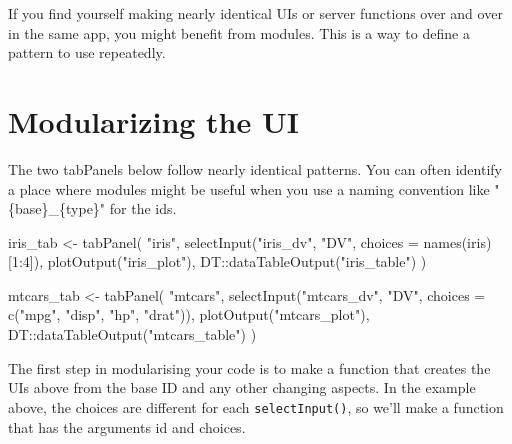 \documentclass[
  oneside]{book}
\newenvironment{Shaded}{\begin{snugshade}}{\end{snugshade}}
\newcommand{\AttributeTok}[1]{\textcolor[rgb]{0.77,0.63,0.00}{#1}}
\newcommand{\DecValTok}[1]{\textcolor[rgb]{0.00,0.00,0.81}{#1}}
\newcommand{\FunctionTok}[1]{\textcolor[rgb]{0.00,0.00,0.00}{#1}}
\newcommand{\NormalTok}[1]{#1}
\newcommand{\OtherTok}[1]{\textcolor[rgb]{0.56,0.35,0.01}{#1}}
\newcommand{\SpecialCharTok}[1]{\textcolor[rgb]{0.00,0.00,0.00}{#1}}
\newcommand{\StringTok}[1]{\textcolor[rgb]{0.31,0.60,0.02}{#1}}
\begin{document}
If you find yourself making nearly identical UIs or server functions over and over in the same app, you might benefit from modules. This is a way to define a pattern to use repeatedly.

\hypertarget{modularizing-the-ui}{%
\section{Modularizing the UI}\label{modularizing-the-ui}}

The two tabPanels below follow nearly identical patterns. You can often identify a place where modules might be useful when you use a naming convention like \StringTok{"\{base\}\_\{type\}"} for the \AttributeTok{id}s.

\begin{Shaded}
\begin{Highlighting}[]
\NormalTok{iris\_tab }\OtherTok{\textless{}{-}} \FunctionTok{tabPanel}\NormalTok{(}
  \StringTok{"iris"}\NormalTok{,}
  \FunctionTok{selectInput}\NormalTok{(}\StringTok{"iris\_dv"}\NormalTok{, }\StringTok{"DV"}\NormalTok{, }\AttributeTok{choices =} \FunctionTok{names}\NormalTok{(iris)[}\DecValTok{1}\SpecialCharTok{:}\DecValTok{4}\NormalTok{]),}
  \FunctionTok{plotOutput}\NormalTok{(}\StringTok{"iris\_plot"}\NormalTok{),}
\NormalTok{  DT}\SpecialCharTok{::}\FunctionTok{dataTableOutput}\NormalTok{(}\StringTok{"iris\_table"}\NormalTok{)}
\NormalTok{)}

\NormalTok{mtcars\_tab }\OtherTok{\textless{}{-}} \FunctionTok{tabPanel}\NormalTok{(}
  \StringTok{"mtcars"}\NormalTok{,}
  \FunctionTok{selectInput}\NormalTok{(}\StringTok{"mtcars\_dv"}\NormalTok{, }\StringTok{"DV"}\NormalTok{, }\AttributeTok{choices =} \FunctionTok{c}\NormalTok{(}\StringTok{"mpg"}\NormalTok{, }\StringTok{"disp"}\NormalTok{, }\StringTok{"hp"}\NormalTok{, }\StringTok{"drat"}\NormalTok{)),}
  \FunctionTok{plotOutput}\NormalTok{(}\StringTok{"mtcars\_plot"}\NormalTok{),}
\NormalTok{  DT}\SpecialCharTok{::}\FunctionTok{dataTableOutput}\NormalTok{(}\StringTok{"mtcars\_table"}\NormalTok{)}
\NormalTok{)}
\end{Highlighting}
\end{Shaded}

The first step in modularising your code is to make a function that creates the UIs above from the base ID and any other changing aspects. In the example above, the choices are different for each \texttt{selectInput}\texttt{()}, so we'll make a function that has the arguments \AttributeTok{id} and \AttributeTok{choices}.
\end{document}
